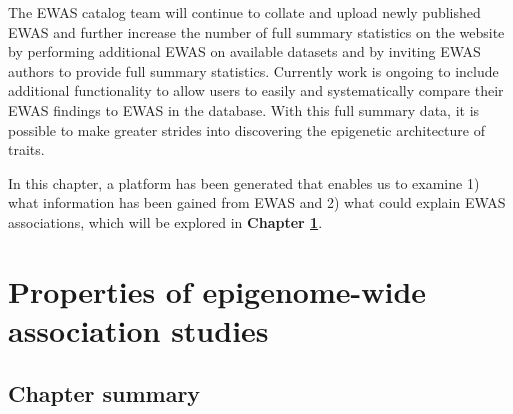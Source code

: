 \documentclass[11pt,oneside]{bristolthesis}
\begin{document}
The EWAS catalog team will continue to collate and upload newly published EWAS and further increase the number of full summary statistics on the website by performing additional EWAS on available datasets and by inviting EWAS authors to provide full summary statistics. Currently work is ongoing to include additional functionality to allow users to easily and systematically compare their EWAS findings to EWAS in the database. With this full summary data, it is possible to make greater strides into discovering the epigenetic architecture of traits.

In this chapter, a platform has been generated that enables us to examine 1) what information has been gained from EWAS and 2) what could explain EWAS associations, which will be explored in \textbf{Chapter \ref{properties-of-ewas}}.

\hypertarget{properties-of-ewas}{%
\chapter{Properties of epigenome-wide association studies}\label{properties-of-ewas}}

\hypertarget{chapter-summary-04}{%
\section{Chapter summary}\label{chapter-summary-04}}
\end{document}
